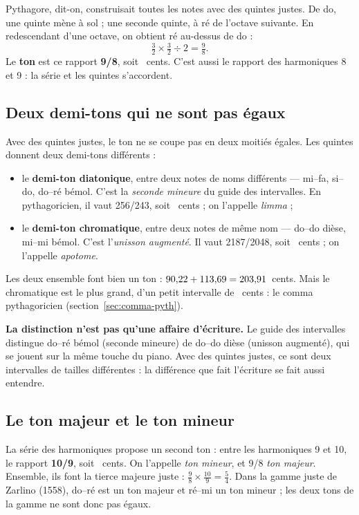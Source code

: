 \documentclass[a4paper,11pt]{article}
\begin{document}
Pythagore, dit-on, construisait toutes les notes avec des quintes justes. De
do, une quinte mène à sol ; une seconde quinte, à ré de l'octave suivante. En
redescendant d'une octave, on obtient ré au-dessus de do :
\[
  \tfrac32 \times \tfrac32 \div 2 = \tfrac98 .
\]
Le \textbf{ton} est ce rapport \textbf{9/8}, soit \tonMaj~cents. C'est aussi
le rapport des harmoniques 8 et 9 : la série et les quintes s'accordent.

\subsection{Deux demi-tons qui ne sont pas égaux}

Avec des quintes justes, le ton ne se coupe pas en deux moitiés égales. Les
quintes donnent deux demi-tons différents :

\begin{itemize}
  \item le \textbf{demi-ton diatonique}, entre deux notes de noms
    différents --- mi--fa, si--do, do--ré bémol. C'est la \emph{seconde
    mineure} du guide des intervalles. En pythagoricien, il vaut 256/243,
    soit \limma~cents ; on l'appelle \emph{limma} ;
  \item le \textbf{demi-ton chromatique}, entre deux notes de même nom ---
    do--do dièse, mi--mi bémol. C'est l'\emph{unisson augmenté}. Il vaut
    2187/2048, soit \apotome~cents ; on l'appelle \emph{apotome}.
\end{itemize}

Les deux ensemble font bien un ton : $90{,}22 + 113{,}69 = 203{,}91$~cents. Mais
le chromatique est le plus grand, d'un petit intervalle de \commaPyth~cents :
le comma pythagoricien (section~\ref{sec:comma-pyth}).

\begin{remarque}
\textbf{La distinction n'est pas qu'une affaire d'écriture.} Le guide des
intervalles distingue do--ré bémol (seconde mineure) de do--do dièse (unisson
augmenté), qui se jouent sur la même touche du piano. Avec des quintes justes,
ce sont deux intervalles de tailles différentes : la différence que fait
l'écriture se fait aussi entendre.
\end{remarque}

\subsection{Le ton majeur et le ton mineur}

La série des harmoniques propose un second ton : entre les harmoniques 9 et
10, le rapport \textbf{10/9}, soit \tonMin~cents. On l'appelle \emph{ton
mineur}, et 9/8 \emph{ton majeur}. Ensemble, ils font la tierce majeure
juste : $\tfrac98 \times \tfrac{10}9 = \tfrac54$. Dans la gamme juste de
Zarlino (1558), do--ré est un ton majeur et ré--mi un ton mineur ; les deux
tons de la gamme ne sont donc pas égaux.
\end{document}
